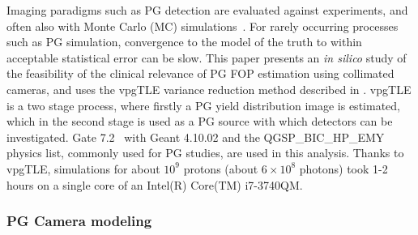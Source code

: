 \documentclass[a4paper,english]{article}
\begin{document}
Imaging paradigms such as PG detection are evaluated against experiments, and often also with Monte Carlo (MC) simulations~\citep{Moteabbed2011,Gueth2013,Robert2013,Golnik2014a,Janssen2014}. For rarely occurring processes such as PG simulation, convergence to the model of the truth to within acceptable statistical error can be slow. This paper presents an \emph{in silico} study of the feasibility of the clinical relevance of PG FOP estimation using collimated cameras, and uses the vpgTLE variance reduction method described in \cite{Huisman2016}. vpgTLE is a two stage process, where firstly a PG yield distribution image is estimated, which in the second stage is used as a PG source with which detectors can be investigated. Gate 7.2~\citep{Sarrut2014} with Geant 4.10.02 and the QGSP\_BIC\_HP\_EMY physics list, commonly used for PG studies, are used in this analysis. Thanks to vpgTLE, simulations for about $10^9$ protons (about $6\times10^8$ photons) took 1-2 hours on a single core of an Intel(R) Core(TM) i7-3740QM.

\subsubsection{PG Camera modeling}\label{sec:camera}
\end{document}
